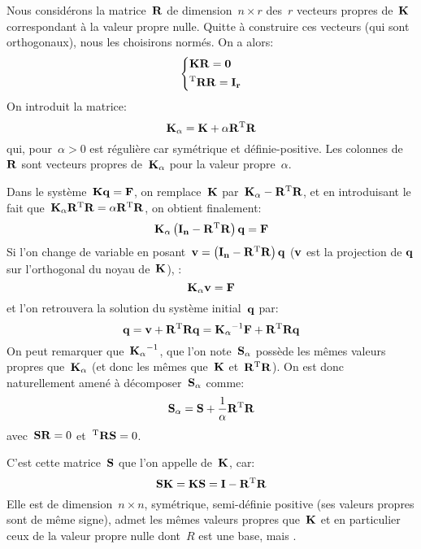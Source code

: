 \medskip
Nous considérons la matrice~$\MM{R}$ de dimension~$n\times r$ des~$r$ vecteurs propres de~$\MM{K}$ correspondant à la valeur propre nulle. Quitte à construire ces vecteurs (qui sont orthogonaux), nous les choisirons normés. On a alors:
\begin{equation}
\left\{
\begin{aligned}
&\MM{K}\MM{R}=\MM{0}\\
&\MMT{R}\MM{R}=\MM{I_r}
\end{aligned}
\right.
\end{equation}
On introduit la matrice:
\begin{equation} \MM{K_\alpha} = \MM{K}+\alpha \MM{R}\MMT{R} \end{equation}
qui, pour~$\alpha>0$ est régulière car symétrique et définie-positive.
Les colonnes de~$\MM{R}$ sont vecteurs propres de~$\MM{K_\alpha}$ pour la valeur propre~$\alpha$.

Dans le système~$\MM{K}\VV{q}=\VV{F}$, on remplace~$\MM{K}$ par~$\MM{K_\alpha}-\MM{R}\MMT{R}$, et en introduisant le
fait que~$\MM{K_\alpha}\MM{R}\MMT{R}=\alpha \MM{R}\MMT{R}$, on obtient finalement:
\begin{equation}
\MM{K_\alpha} \left(\MM{I_n}-\MM{R}\MMT{R}\right)\VV{q}=\VV{F}
\end{equation}
Si l'on change de variable en posant~$\VV{v}=\left(\MM{I_n}-\MM{R}\MMT{R}\right)\VV{q}$ ($\VV{v}$ est la projection de
$\VV{q}$ sur l'orthogonal du noyau de~$\MM{K}$), :
\begin{equation}
\MM{K_\alpha}\VV{v}=\VV{F}
\end{equation}
et l'on retrouvera la solution du système initial~$\VV{q}$ par:
\begin{equation}\VV{q}=\VV{v}+\MM{R}\MMT{R}\VV{q} = \MMI{K_\alpha}\VV{F}+\MM{R}\MMT{R}\VV{q}\end{equation}
\medskip
On peut remarquer que~$\MMI{K_\alpha}$, que l'on note~$\MM{S_\alpha}$ possède les mêmes valeurs propres que~$\MM{K_\alpha}$ (et donc les mêmes que~$\MM{K}$ et~$\MM{R}\MMT{R}$). On est donc naturellement amené à décomposer~$\MM{S_\alpha}$ comme:
\begin{equation} \MM{S_\alpha}=\MM{S}+\frac1\alpha \MM{R}\MMT{R}\end{equation}
avec~$\MM{S}\MM{R}=0$ et~$\MMT{R}\MM{S}=0$.

C'est cette matrice~$\MM{S}$ que l'on appelle  de~$\MM{K}$, car:
\begin{equation} \MM{S}\MM{K} = \MM{K}\MM{S} = \MM{I} -\MM{R}\MMT{R}\end{equation}
Elle est de dimension~$n\times n$, symétrique, semi-définie positive (ses valeurs propres sont de même signe), admet les mêmes valeurs propres que~$\MM{K}$ et en particulier ceux de la valeur propre nulle dont~$R$ est une base, mais .


